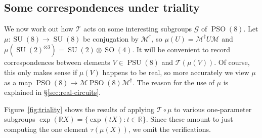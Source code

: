 \documentclass[reqno]{amsart}
\theoremstyle{definition} \newtheorem{example}[theorem]{Example}
\newcommand{\RR}{\mathbb{R}}
\newcommand{\PSU}{\operatorname{PSU}}
\newcommand{\SU}{\operatorname{SU}}
\newcommand{\SO}{\operatorname{SO}}
\newcommand{\PSO}{\operatorname{PSO}}
\newcommand{\secsymbol}{§}
\newcommand{\G}{\mathcal{G}}
\newcommand{\T}{\mathcal{T}}
\newcommand{\M}{\mathcal{M}}
\begin{document}
\subsection{Some correspondences under triality} \label{subsec:correspondences} We now work out how $\T$ acts on some interesting subgroups $\G$ of $\PSO(8)$. Let $\mu : \SU(8) \to \SU(8)$ be conjugation by $\M^\dagger$, so $\mu(U) = \M^\dagger U \M$ and $\mu(\SU(2)^{\otimes 3}) = \SU(2) \otimes \SO(4)$. It will be convenient to record correspondences between elements $V \in \PSU(8)$ and $\T(\mu(V))$. Of course, this only makes sense if $\mu(V)$ happens to be real, so more accurately we view $\mu$ as a map $\PSO(8) \to \M\PSO(8)\M^\dagger$. The reason for the use of $\mu$ is explained in \secsymbol\ref{sec:real-circuits}.

Figure~\ref{fig:triality} shows the results of applying $\T \circ \mu$ to various one-parameter subgroups $\exp(\RR X) = \{\exp(tX) : t \in \RR\}$. Since these amount to just computing the one element $\tau(\mu(X))$, we omit the verifications. 
\end{document}
